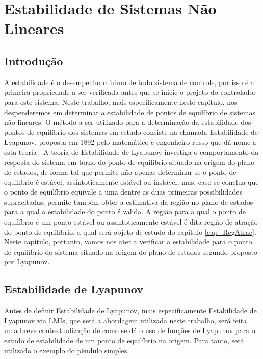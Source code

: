 \chapter{Estabilidade de Sistemas Não Lineares}\label{cap_EstSistNaoLin}


\section{Introdução}

A estabilidade é o desempenho mínimo de todo sistema de controle, por isso é a primeira propriedade a ser verificada antes que se inicie o projeto do controlador para este sistema. Neste trabalho, mais especificamente neste capítulo, nos despenderemos em determinar a estabilidade de pontos de equilíbrio de sistemas não lineares. O método a ser utilizado para a determinação da estabilidade dos pontos de equilíbrio dos sistemas em estudo consiste na chamada Estabilidade de Lyapunov, proposta em 1892  pelo matemático e engenheiro russo que dá nome a esta teoria \cite{bookkhalil:2003}. A teoria de Estabilidade de Lyapunov investiga o comportamento da resposta do sistema em torno do ponto de equilíbrio situado na origem do plano de estados, de forma tal que permite não apenas determinar se o ponto de equilíbrio é estável, assintoticamente estável ou instável, mas, caso se conclua que o ponto de equilíbrio equivale a uma dentre as duas primeiras possibilidades supracitadas, permite também obter a estimativa da região no plano de estados para a qual a estabilidade do ponto é valida. A região para a qual o ponto de equilíbrio é um ponto estável ou assintoticamente estável é dita região de atração do ponto de equilíbrio, a qual será objeto de estudo do capítulo \ref{cap_RegAtrac}. Neste capítulo, portanto, vamos nos ater a verificar a estabilidade para o ponto de equilíbrio do sistema situado na origem do plano de estados segundo proposto por Lyapunov.

\section{Estabilidade de Lyapunov}

Antes de definir Estabilidade de Lyapunov, mais especificamente Estabilidade de Lyapunov via LMIs, que será a abordagem utilizada neste trabalho, será feita uma breve contextualização de como se dá o uso de funções de Lyapunov para o estudo de estabilidade de um ponto de equilíbrio na origem. Para tanto, será utilizado o exemplo do pêndulo simples.

